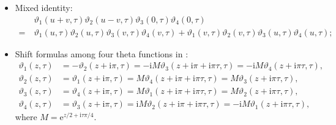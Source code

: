 \documentclass[11pt,reqno]{amsart}
\newcommand{\ii}{\mathrm{i}}
\newcommand{\ee}{\mathrm{e}}
\numberwithin{equation}{section}
\begin{document}
\begin{itemize}
	\item Mixed identity:
	\begin{equation}\label{eq:formula-theta-2-1}
		\begin{split}
			&\ \vartheta_1(u+v,\tau)\vartheta_2(u-v,\tau)\vartheta_3(0,\tau)\vartheta_4(0,\tau)\\
			= &\ \vartheta_1(u,\tau)\vartheta_2(u,\tau)\vartheta_3(v,\tau)\vartheta_4(v,\tau)+\vartheta_1(v,\tau)\vartheta_2(v,\tau)\vartheta_3(u,\tau)\vartheta_4(u,\tau);
		\end{split}
	\end{equation}
%	
	\item Shift formulas among four theta functions in \cite{ArmitageE-06-elliptic-function}:
	\begin{equation}\label{eq:Jacobi-Theta-K-iK}
		\begin{split}
			\vartheta_1(z,\tau)&=-\vartheta_2\left(z+\ii\pi,\tau\right)=-\ii M \vartheta_3\left(z+\ii \pi+ \ii\pi\tau,\tau \right)=-\ii M\vartheta_4\left(z+\ii\pi\tau,\tau \right),\\
			\vartheta_2(z,\tau)&=\vartheta_1\left(z+\ii\pi ,\tau\right)=M \vartheta_4\left(z+\ii\pi +\ii\pi \tau,\tau \right)= M\vartheta_3\left(z+\ii\pi \tau ,\tau\right),\\
			\vartheta_3(z,\tau)&=\vartheta_4\left(z+\ii\pi ,\tau\right)= M \vartheta_1\left(z+\ii\pi +\ii\pi\tau,\tau \right)= M\vartheta_2\left(z+\ii\pi \tau,\tau\right),\\
			\vartheta_4(z,\tau)&=\vartheta_3\left(z+\ii\pi ,\tau \right)=\ii M \vartheta_2\left(z+\ii\pi+\ii\pi \tau,\tau \right)=-\ii M\vartheta_1\left(z+\ii\pi \tau,\tau \right),
		\end{split}
	\end{equation}
	where $M=\ee^{z/2+\ii \tau \pi /4}$.
\end{itemize}
\end{document}
